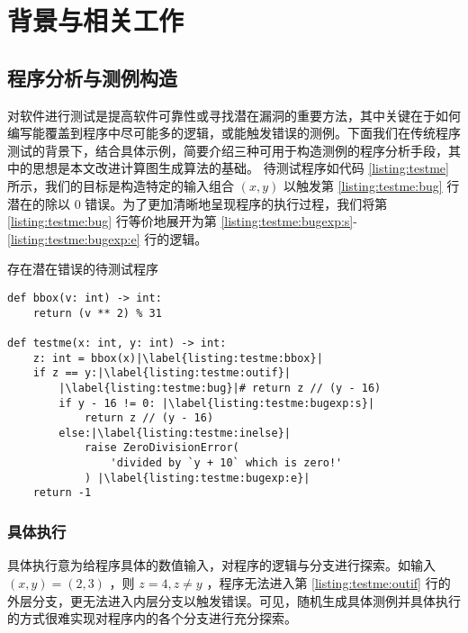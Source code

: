 
\chapter{背景与相关工作}
\label{chp:bg}

\section{程序分析与测例构造}

对软件进行测试是提高软件可靠性或寻找潜在漏洞的重要方法，其中关键在于如何编写能覆盖到程序中尽可能多的逻辑，或能触发错误的测例。下面我们在传统程序测试的背景下，结合具体示例，简要介绍三种可用于构造测例的程序分析手段，其中的思想是本文改进计算图生成算法的基础。
待测试程序如代码 \ref{listing:testme} 所示，我们的目标是构造特定的输入组合 $(x, y)$ 以触发第 \ref{listing:testme:bug} 行潜在的除以 0 错误。为了更加清晰地呈现程序的执行过程，我们将第 \ref{listing:testme:bug} 行等价地展开为第 \ref{listing:testme:bugexp:s}-\ref{listing:testme:bugexp:e} 行的逻辑。

\begin{listing}[]
    \caption{存在潜在错误的待测试程序}
    \label{listing:testme}
\begin{verbatim}
def bbox(v: int) -> int:
    return (v ** 2) % 31

def testme(x: int, y: int) -> int:
    z: int = bbox(x)|\label{listing:testme:bbox}|
    if z == y:|\label{listing:testme:outif}|
        |\label{listing:testme:bug}|# return z // (y - 16)
        if y - 16 != 0: |\label{listing:testme:bugexp:s}|
            return z // (y - 16)
        else:|\label{listing:testme:inelse}|
            raise ZeroDivisionError(
                'divided by `y + 10` which is zero!'
            ) |\label{listing:testme:bugexp:e}|
    return -1
\end{verbatim}
\end{listing}

\subsection{具体执行}

具体执行意为给程序具体的数值输入，对程序的逻辑与分支进行探索。如输入 $(x, y) = (2, 3)$ ，则 $z = 4, z \neq y$ ，程序无法进入第 \ref{listing:testme:outif} 行的外层分支，更无法进入内层分支以触发错误。可见，随机生成具体测例并具体执行的方式很难实现对程序内的各个分支进行充分探索。

